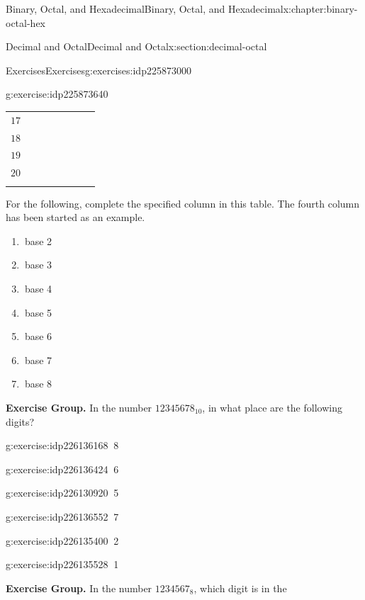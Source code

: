 \documentclass[twoside,10pt,]{book}
\numberwithin{equation}{section}
\newcommand{\hrulethin}  {\noalign{\hrule height 0.04em}}
\newcommand{\hrulethick} {\noalign{\hrule height 0.11em}}
\begin{document}
\begin{chapterptx}{Binary, Octal, and Hexadecimal}{}{Binary, Octal, and Hexadecimal}{}{}{x:chapter:binary-octal-hex}
\begin{sectionptx}{Decimal and Octal}{}{Decimal and Octal}{}{}{x:section:decimal-octal}
\begin{exercises-subsection}{Exercises}{}{Exercises}{}{}{g:exercises:idp225873000}
\begin{divisionexercise}{1}{}{}{g:exercise:idp225873640}
\begin{center}
{\begin{tabular}{cccccccc}
\(17\)&&&&&&&\tabularnewline\hrulethin
\(18\)&&&&&&&\tabularnewline\hrulethin
\(19\)&&&&&&&\tabularnewline\hrulethin
\(20\)&&&&&&&\tabularnewline\hrulethick
\end{tabular}
}%
\end{center}%
 For the following, complete the specified column in this table.  The fourth column has been started as an example.%
%
\begin{enumerate}[label=(\alph*)]
\item{}\(\ \)base 2%
\item{}\(\ \)base 3%
\item{}\(\ \)base 4%
\item{}\(\ \)base 5%
\item{}\(\ \)base 6%
\item{}\(\ \)base 7%
\item{}\(\ \)base 8%
\end{enumerate}
\end{divisionexercise}%
\par\medskip\noindent%
\textbf{Exercise Group.}\space\space%
In the number \(12345678_{10}\), in what place are the following digits?%
\begin{exercisegroup}
\begin{divisionexerciseeg}{2}{}{}{g:exercise:idp226136168}%
\(\ \)8\end{divisionexerciseeg}%
\begin{divisionexerciseeg}{3}{}{}{g:exercise:idp226136424}%
\(\ \)6\end{divisionexerciseeg}%
\begin{divisionexerciseeg}{4}{}{}{g:exercise:idp226130920}%
\(\ \)5\end{divisionexerciseeg}%
\begin{divisionexerciseeg}{5}{}{}{g:exercise:idp226136552}%
\(\ \)7\end{divisionexerciseeg}%
\begin{divisionexerciseeg}{6}{}{}{g:exercise:idp226135400}%
\(\ \)2\end{divisionexerciseeg}%
\begin{divisionexerciseeg}{7}{}{}{g:exercise:idp226135528}%
\(\ \)1\end{divisionexerciseeg}%
\end{exercisegroup}
\par\medskip\noindent
\par\medskip\noindent%
\textbf{Exercise Group.}\space\space%
In the number \(1234567_8\), which digit is in the%
\begin{exercisegroup}

\end{exercisegroup}
\end{exercises-subsection}
\end{sectionptx}
\end{chapterptx}
\end{document}
